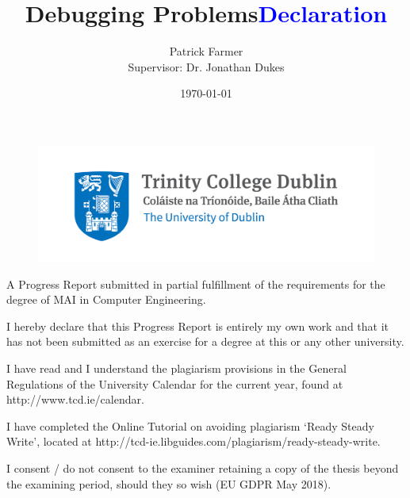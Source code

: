 \documentclass[12pt]{extarticle}
\begin{document}
\doublespacing

\title{\textbf{Debugging Problems}}
\author{Patrick Farmer\\ Supervisor: Dr. Jonathan Dukes}
\date{\today}
\maketitle

\begin{figure}[h!]
\centering
\includegraphics[width=\linewidth]{Images/Trinity_Main_Logo.jpg}
\label{fig:logo}
\end{figure}

\begin{center}
\large A Progress Report submitted in partial fulfillment of the requirements for the degree of MAI in Computer Engineering.
\end{center}

\newpage
\title {\Huge \textbf{\textcolor{blue}{Declaration}}}

\vspace{0.5cm}
\small I hereby declare that this Progress Report is entirely my own work and that it has not been submitted as an exercise for a degree at this or any other university.

\vspace{0.5cm}
\small I have read and I understand the plagiarism provisions in the General Regulations of the University Calendar for the current year, found at http://www.tcd.ie/calendar.
\vspace{0.5cm}

\small I have completed the Online Tutorial on avoiding plagiarism `Ready Steady Write', located at http://tcd-ie.libguides.com/plagiarism/ready-steady-write.
\vspace{0.5cm}

\small I consent / do not consent to the examiner retaining a copy of the thesis beyond the examining period, should they so wish (EU GDPR May 2018).
\vspace{0.5cm}
\end{document}
